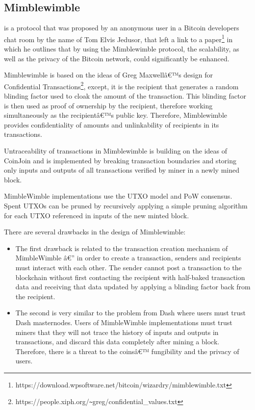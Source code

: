 \documentclass[8pt,fleqn,openany]{book}
\begin{document}
{		\subsection{Mimblewimble} is a protocol that was proposed by an anonymous user in a Bitcoin developers chat room by the name of Tom Elvis Jedusor, that left a link to a paper\footnote{https://download.wpsoftware.net/bitcoin/wizardry/mimblewimble.txt} in which he outlines that by using the Mimblewimble protocol, the scalability, as well as the privacy of the Bitcoin network, could significantly be enhanced.
		
		Mimblewimble is based on the ideas of Greg Maxwellâ€™s design for Confidential Transactions\footnote{https://people.xiph.org/\texttt{\~}greg/confidential\_values.txt}, except, it is the recipient that generates a random blinding factor used to cloak the amount of the transaction. This blinding factor is then used as proof of ownership by the recipient, therefore working simultaneously as the recipientâ€™s public key. Therefore, Mimblewimble provides confidentiality of amounts and unlinkability of recipients in its transactions.
		
		Untraceability of transactions in Mimblewimble is building on the ideas of CoinJoin and is implemented by breaking transaction boundaries and storing only inputs and outputs of all transactions verified by miner in a newly mined block.
		
		MimbleWimble implementations use the UTXO model and PoW consensus. Spent UTXOs can be pruned by recursively applying a simple pruning algorithm for each UTXO referenced in inputs of the new minted block.
		
		There are several drawbacks in the design of Mimblewimble:
		
		\begin{itemize}
			\item {The first drawback is related to the transaction creation mechanism of MimbleWimble â€” in order to create a transaction, senders and recipients must interact with each other. The sender cannot post a transaction to the blockchain without first contacting the recipient with half-baked transaction data and receiving that data updated by applying a blinding factor back from the recipient.}
			\item {The second is very similar to the problem from Dash where users must trust Dash masternodes. Users of MimbleWimble implementations must trust miners that they will not trace the history of inputs and outputs in transactions, and discard this data completely after mining a block. Therefore, there is a threat to the coinsâ€™ fungibility and the privacy of users.}
		\end{itemize}
		
}
\end{document}
